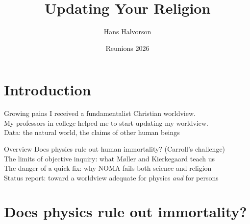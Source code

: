 \documentclass{beamer}
\title{Updating Your Religion}
\author{Hans Halvorson}
\institute{Princeton University}
\date{Reunions 2026}
\begin{document}

\maketitle



\section{Introduction}

\begin{frame}{Growing pains}
  I received a fundamentalist Christian worldview.\\[1em]
  
 My professors in college helped me to start updating my worldview.\\[1em]

 Data: the natural world, the claims of other human beings
\end{frame}

\begin{frame}{Overview}
  Does physics rule out human immortality? (Carroll's challenge)\\[1em]
  
  The limits of objective inquiry: what Møller and Kierkegaard teach us\\[1em]
  
  The danger of a quick fix: why NOMA fails both science and religion\\[1em]
  
  Status report: toward a worldview adequate for physics \emph{and} for persons
\end{frame}


\section{Does physics rule out immortality?}
\end{document}
